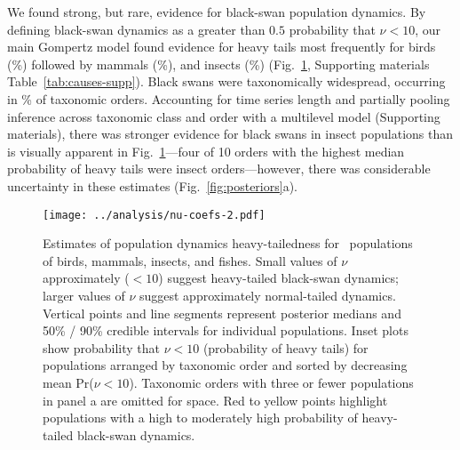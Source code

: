 We found strong, but rare, evidence for black-swan population dynamics. By
defining black-swan dynamics as a greater than $0.5$ probability that $\nu <
10$, our main Gompertz model found evidence for heavy tails most frequently
for birds (\birdPH\%) followed by mammals (\mammalsPH\%), and insects
(\insectsPH\%) (Fig.~\ref{fig:nu-coefs}, Supporting materials Table~\ref{tab:causes-supp}). Black
swans were taxonomically widespread, occurring in \POrdersHeavy\% of taxonomic
orders. Accounting for time series length and partially pooling inference
across taxonomic class and order with a multilevel model (Supporting
materials), there was stronger evidence for black swans in insect
populations than is visually apparent in Fig.~\ref{fig:nu-coefs}---four of 10
orders with the highest median probability of heavy tails were insect
orders---however, there was considerable uncertainty in these estimates
(Fig.~\ref{fig:posteriors}a).

\begin{figure}[htbp]
\begin{center}
\texttt{[image: ../analysis/nu-coefs-2.pdf]}

\caption[Estimates of population dynamics heavy-tailedness for \nuCoefPopN\
  populations of birds, mammals, insects, and fishes.]{Estimates of population dynamics heavy-tailedness for \nuCoefPopN\
  populations of birds, mammals, insects, and fishes. Small values of $\nu$
  approximately ($< 10$) suggest heavy-tailed black-swan dynamics; larger values of
  $\nu$ suggest approximately normal-tailed dynamics. Vertical points and line
  segments represent posterior medians and 50\% / 90\% credible intervals for
  individual populations. Inset plots show probability that $\nu < 10$
  (probability of heavy tails) for populations arranged by taxonomic order and
  sorted by decreasing mean Pr($\nu < 10$). Taxonomic orders with three or
  fewer populations in panel a are omitted for space. Red to yellow points
  highlight populations with a high to moderately high probability of
  heavy-tailed black-swan dynamics.}

\label{fig:nu-coefs}
\end{center}
\end{figure}

